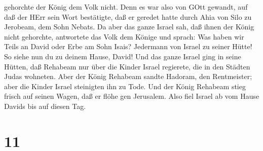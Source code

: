 gehorchte der König dem Volk nicht. Denn es war also von GOtt gewandt,
auf daß der HErr sein Wort bestätigte, daß er geredet hatte durch Ahia
von Silo zu Jerobeam, dem Sohn Nebats.  Da aber das ganze
Israel sah, daß ihnen der König nicht gehorchte, antwortete das Volk dem
Könige und sprach: Was haben wir Teils an David oder Erbe am Sohn Isais?
Jedermann von Israel zu seiner Hütte! So siehe nun du zu deinem Hause,
David! Und das ganze Israel ging in seine Hütten,  daß
Rehabeam nur über die Kinder Israel regierete, die in den Städten Judas
wohneten.  Aber der König Rehabeam sandte Hadoram, den
Rentmeister; aber die Kinder Israel steinigten ihn zu Tode. Und der
König Rehabeam stieg frisch auf seinen Wagen, daß er flöhe gen
Jerusalem.  Also fiel Israel ab vom Hause Davids bis auf
diesen Tag.

\hypertarget{section-10}{%
\section{11}\label{section-10}}

